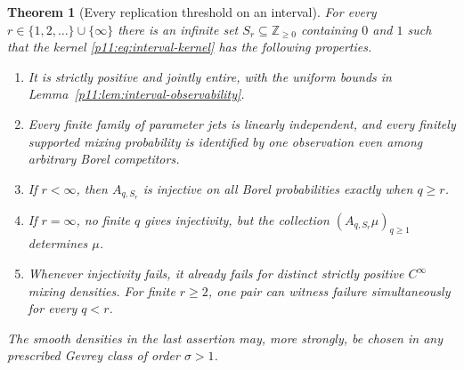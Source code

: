 \documentclass[11pt,letterpaper]{article}
\newtheorem{theorem}{Theorem}[section]
\theoremstyle{definition}
\theoremstyle{remark}
\newcommand{\1}{\mathbf 1}
\begin{document}
\begin{theorem}[Every replication threshold on an interval]
\label{p11:thm:interval-threshold}
For every $r\in\{1,2,\ldots\}\cup\{\infty\}$ there is an infinite
set $S_r\subseteq\mathbb Z_{\geq0}$ containing $0$ and $1$ such that
the kernel \eqref{p11:eq:interval-kernel} has the following properties.
\begin{enumerate}
\item It is strictly positive and jointly entire, with the uniform
      bounds in Lemma~\ref{p11:lem:interval-observability}.
\item Every finite family of parameter jets is linearly independent,
      and every finitely supported mixing probability is identified
      by one observation even among arbitrary Borel competitors.
\item If $r<\infty$, then $A_{q,S_r}$ is injective on all Borel
      probabilities exactly when $q\geq r$.
\item If $r=\infty$, no finite $q$ gives injectivity, but the
      collection $(A_{q,S_r}\mu)_{q\geq1}$ determines $\mu$.
\item Whenever injectivity fails, it already fails for distinct
      strictly positive $C^\infty$ mixing densities.  For finite
      $r\geq2$, one pair can witness failure simultaneously for
      every $q<r$.
\end{enumerate}
The smooth densities in the last assertion may, more strongly, be
chosen in any prescribed Gevrey class of order $\sigma>1$.
\end{theorem}
\end{document}
